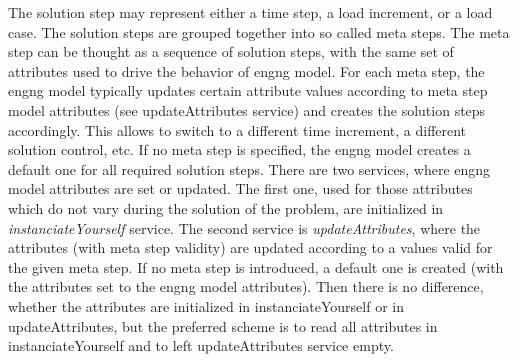 \documentclass[12pt,draft]{article}
\newcommand{\service}[1]{{\em #1}}
\begin{document}
The solution step may represent either a time step, a load increment, or a load
case. The solution steps are grouped together into so called meta steps. 
The meta step can be thought as a sequence of
solution steps, with the same set of attributes used to drive the behavior of
engng model.
For each meta step, the engng model typically updates  
certain attribute values  according to meta step model  attributes (see
updateAttributes service) and creates the solution steps
accordingly. This allows to switch to a different time increment, 
a different solution control, etc. If no meta step is specified, the engng model
creates a default one for all required solution steps. There are two
services, where engng model attributes are set or updated. The first one,
used for those attributes which do not vary during the solution 
of the problem, are initialized  in \service{instanciateYourself} service.
The second service is \service{updateAttributes}, where the attributes 
(with meta step validity) are updated according to a values valid for the
given meta step.
If no meta step is introduced, a default one is created 
(with the attributes set to the engng model attributes). 
Then there is no difference, whether the attributes are initialized 
in instanciateYourself or in updateAttributes, but
the preferred scheme is to read all attributes in instanciateYourself 
and to left updateAttributes service empty.
\end{document}
